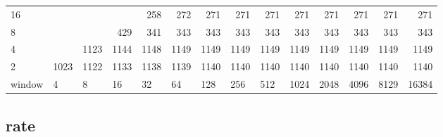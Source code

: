 \begin{table}[]
{\begin{tabular}{l|rrrrrrrrrrrrr}
			\multicolumn{1}{|l|}{16} &  &  &  & \cellcolor[HTML]{99E600}258 & \cellcolor[HTML]{99E600}272 & \cellcolor[HTML]{99E600}271 & \cellcolor[HTML]{99E600}271 & \cellcolor[HTML]{99E600}271 & \cellcolor[HTML]{99E600}271 & \cellcolor[HTML]{99E600}271 & \cellcolor[HTML]{99E600}271 & \cellcolor[HTML]{99E600}271 & \cellcolor[HTML]{99E600}271 \\ \cline{1-1}
			\multicolumn{1}{|l|}{8} &  &  & \cellcolor[HTML]{E69900}429 & \cellcolor[HTML]{99E600}341 & \cellcolor[HTML]{99E600}343 & \cellcolor[HTML]{99E600}343 & \cellcolor[HTML]{99E600}343 & \cellcolor[HTML]{99E600}343 & \cellcolor[HTML]{99E600}343 & \cellcolor[HTML]{99E600}343 & \cellcolor[HTML]{99E600}343 & \cellcolor[HTML]{99E600}343 & \cellcolor[HTML]{99E600}343 \\ \cline{1-1}
			\multicolumn{1}{|l|}{4} &  & \cellcolor[HTML]{4C00E6}1123 & \cellcolor[HTML]{4C00E6}1144 & \cellcolor[HTML]{4C00E6}1148 & \cellcolor[HTML]{4C00E6}1149 & \cellcolor[HTML]{4C00E6}1149 & \cellcolor[HTML]{4C00E6}1149 & \cellcolor[HTML]{4C00E6}1149 & \cellcolor[HTML]{4C00E6}1149 & \cellcolor[HTML]{4C00E6}1149 & \cellcolor[HTML]{4C00E6}1149 & \cellcolor[HTML]{4C00E6}1149 & \cellcolor[HTML]{4C00E6}1149 \\ \cline{1-1}
			\multicolumn{1}{|l|}{2} & \cellcolor[HTML]{4C00E6}1023 & \cellcolor[HTML]{4C00E6}1122 & \cellcolor[HTML]{4C00E6}1133 & \cellcolor[HTML]{4C00E6}1138 & \cellcolor[HTML]{4C00E6}1139 & \cellcolor[HTML]{4C00E6}1140 & \cellcolor[HTML]{4C00E6}1140 & \cellcolor[HTML]{4C00E6}1140 & \cellcolor[HTML]{4C00E6}1140 & \cellcolor[HTML]{4C00E6}1140 & \cellcolor[HTML]{4C00E6}1140 & \cellcolor[HTML]{4C00E6}1140 & \cellcolor[HTML]{4C00E6}1140 \\ \cline{1-1}
			window & \multicolumn{1}{l|}{4} & \multicolumn{1}{l|}{8} & \multicolumn{1}{l|}{16} & \multicolumn{1}{l|}{32} & \multicolumn{1}{l|}{64} & \multicolumn{1}{l|}{128} & \multicolumn{1}{l|}{256} & \multicolumn{1}{l|}{512} & \multicolumn{1}{l|}{1024} & \multicolumn{1}{l|}{2048} & \multicolumn{1}{l|}{4096} & \multicolumn{1}{l|}{8129} & \multicolumn{1}{l|}{16384} \\ \cline{2-14} 
		\end{tabular}
	}
\end{table}



\subsection{rate}
